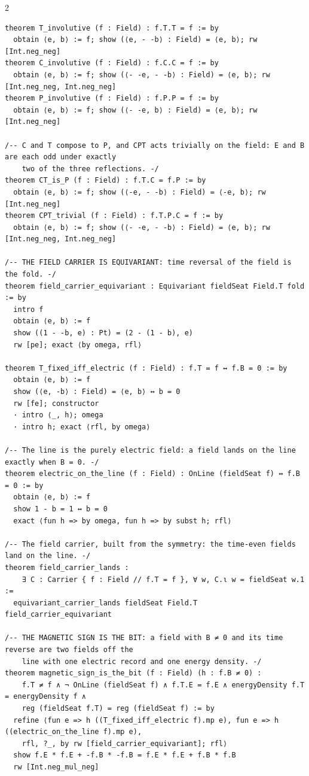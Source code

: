 \documentclass[10pt]{article}
\begin{document}
\begin{multicols}{2}
\begin{Verbatim}[fontsize=\fontsize{6.0}{6.9}\selectfont,breaklines,breakanywhere,breaksymbolleft={}]
theorem T_involutive (f : Field) : f.T.T = f := by
  obtain ⟨e, b⟩ := f; show (⟨e, - -b⟩ : Field) = ⟨e, b⟩; rw [Int.neg_neg]
theorem C_involutive (f : Field) : f.C.C = f := by
  obtain ⟨e, b⟩ := f; show (⟨- -e, - -b⟩ : Field) = ⟨e, b⟩; rw [Int.neg_neg, Int.neg_neg]
theorem P_involutive (f : Field) : f.P.P = f := by
  obtain ⟨e, b⟩ := f; show (⟨- -e, b⟩ : Field) = ⟨e, b⟩; rw [Int.neg_neg]

/-- C and T compose to P, and CPT acts trivially on the field: E and B are each odd under exactly
    two of the three reflections. -/
theorem CT_is_P (f : Field) : f.T.C = f.P := by
  obtain ⟨e, b⟩ := f; show (⟨-e, - -b⟩ : Field) = ⟨-e, b⟩; rw [Int.neg_neg]
theorem CPT_trivial (f : Field) : f.T.P.C = f := by
  obtain ⟨e, b⟩ := f; show (⟨- -e, - -b⟩ : Field) = ⟨e, b⟩; rw [Int.neg_neg, Int.neg_neg]

/-- THE FIELD CARRIER IS EQUIVARIANT: time reversal of the field is the fold. -/
theorem field_carrier_equivariant : Equivariant fieldSeat Field.T fold := by
  intro f
  obtain ⟨e, b⟩ := f
  show ((1 - -b, e) : Pt) = (2 - (1 - b), e)
  rw [pe]; exact ⟨by omega, rfl⟩

theorem T_fixed_iff_electric (f : Field) : f.T = f ↔ f.B = 0 := by
  obtain ⟨e, b⟩ := f
  show (⟨e, -b⟩ : Field) = ⟨e, b⟩ ↔ b = 0
  rw [fe]; constructor
  · intro ⟨_, h⟩; omega
  · intro h; exact ⟨rfl, by omega⟩

/-- The line is the purely electric field: a field lands on the line exactly when B = 0. -/
theorem electric_on_the_line (f : Field) : OnLine (fieldSeat f) ↔ f.B = 0 := by
  obtain ⟨e, b⟩ := f
  show 1 - b = 1 ↔ b = 0
  exact ⟨fun h => by omega, fun h => by subst h; rfl⟩

/-- The field carrier, built from the symmetry: the time-even fields land on the line. -/
theorem field_carrier_lands :
    ∃ C : Carrier { f : Field // f.T = f }, ∀ w, C.ι w = fieldSeat w.1 :=
  equivariant_carrier_lands fieldSeat Field.T field_carrier_equivariant

/-- THE MAGNETIC SIGN IS THE BIT: a field with B ≠ 0 and its time reverse are two fields off the
    line with one electric record and one energy density. -/
theorem magnetic_sign_is_the_bit (f : Field) (h : f.B ≠ 0) :
    f.T ≠ f ∧ ¬ OnLine (fieldSeat f) ∧ f.T.E = f.E ∧ energyDensity f.T = energyDensity f ∧
    reg (fieldSeat f.T) = reg (fieldSeat f) := by
  refine ⟨fun e => h ((T_fixed_iff_electric f).mp e), fun e => h ((electric_on_the_line f).mp e),
    rfl, ?_, by rw [field_carrier_equivariant]; rfl⟩
  show f.E * f.E + -f.B * -f.B = f.E * f.E + f.B * f.B
  rw [Int.neg_mul_neg]


\end{Verbatim}
\end{multicols}
\end{document}
